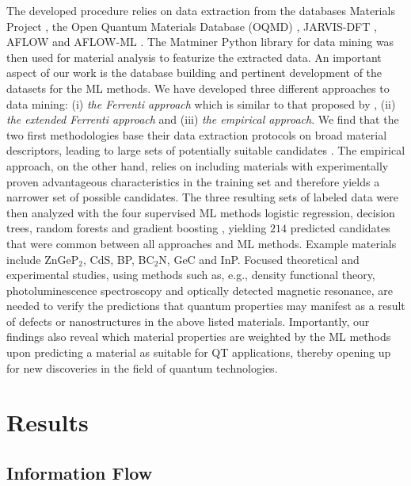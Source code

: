 \documentclass[superscriptaddress,unsortedaddress,
 amsmath,amssymb,
 aps,
]{revtex4-2}
\begin{document}
The developed procedure relies on data extraction from the databases Materials Project \cite{Jain2013,Jain2018}, the Open Quantum Materials Database (OQMD) \cite{Saal2013, Kirklin2015}, JARVIS-DFT \cite{Choudhary2020}, AFLOW \cite{Curtarolo2012, Curtarolo2012a, Calderon2015} and AFLOW-ML \cite{Isayev2017}. 
The Matminer Python library for data mining \cite{Ward2018} was then used for material analysis to featurize the extracted data. An important aspect of our work is the database building and pertinent development of the datasets for the ML methods. We have developed three different approaches to data mining: (i) \emph{the Ferrenti approach} which is similar to that proposed by \citeauthor{Ferrenti2020} \cite{Ferrenti2020}, (ii) \emph{the extended Ferrenti approach} and (iii) \emph{the empirical approach}. We find that the two first methodologies base their data extraction protocols on broad material descriptors, leading to large sets of potentially suitable candidates \cite{Mehta2019,Hastie2009}. The empirical approach, on the other hand, relies on including materials with experimentally proven advantageous characteristics in the training set and therefore yields a narrower set of possible candidates. The three resulting sets of labeled data were then analyzed with the four supervised ML methods logistic regression, decision trees, random forests and gradient boosting \cite{Hastie2009,Murphy2012}, yielding $214$ predicted candidates that were common between all approaches and ML methods.  
Example materials include ZnGeP$_2$, CdS, BP, BC$_2$N, GeC and InP. Focused theoretical and experimental studies, using methods such as, e.g., density functional theory, photoluminescence spectroscopy and optically detected magnetic resonance, are needed to verify the predictions that quantum properties may manifest as a result of defects or nanostructures in the above listed materials. 
Importantly, our findings also reveal which material properties are weighted by the ML methods upon predicting a material as suitable for QT applications, thereby opening up for new  discoveries in the field of quantum technologies. 


\section*{Results}

\subsection*{Information Flow} 
\end{document}
